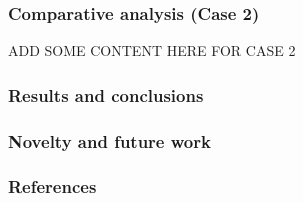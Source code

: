 \documentclass[table,10pt,red]{beamer}	%
\begin{document}
\begin{frame}
\frametitle{Comparative analysis (Case 2)}
	ADD SOME CONTENT HERE FOR CASE 2
\end{frame}


\begin{frame}
	\frametitle{Results and conclusions}
\end{frame}

\begin{frame}
	\frametitle{Novelty and future work}
\end{frame}

\begin{frame}
	\frametitle{References}
\end{frame}
\end{document}
